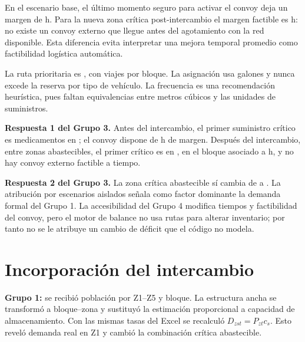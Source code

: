 \documentclass[11pt,letterpaper]{article}
\begin{document}
En el escenario base, el último momento seguro para activar el convoy deja un
margen de \MargenConvoyBase{} h. Para la nueva zona crítica post-intercambio el
margen factible es \MargenConvoy{} h: no existe un convoy externo que llegue
antes del agotamiento con la red disponible. Esta diferencia evita interpretar
una mejora temporal promedio como factibilidad logística automática.

La ruta prioritaria es \RutaPrioritaria{}, con
\ViajesRutaPrioritaria{} viajes por bloque. La asignación usa
\CombustibleUtilizado{} galones y nunca excede la reserva por tipo de vehículo.
La frecuencia es una recomendación heurística, pues faltan equivalencias entre
metros cúbicos y las unidades de suministros.

\begin{table}[H]
\centering
\caption{Primeras rutas de la recomendación de distribución.}
\label{tab:plan}
\scriptsize

\end{table}

\begin{table}[H]
\centering
\caption{Principales cuellos de botella trazados a los datos.}
\label{tab:cuellos}
\small

\end{table}

\textbf{Respuesta 1 del Grupo 3.} Antes del intercambio, el primer suministro
crítico es medicamentos en \ZonaCriticaBase{}; el convoy dispone de
\MargenConvoyBase{} h de margen. Después del intercambio, entre zonas
abastecibles, el primer crítico es \SuministroCritico{} en
\ZonaCriticaPost{}, en el bloque asociado a \TiempoAgotamientoMedio{} h, y no
hay convoy externo factible a tiempo.

\textbf{Respuesta 2 del Grupo 3.} La zona crítica abastecible sí cambia de
\ZonaCriticaBase{} a \ZonaCriticaPost{}. La atribución por escenarios aislados
señala como factor dominante la demanda formal del Grupo 1. La accesibilidad del
Grupo 4 modifica tiempos y factibilidad del convoy, pero el motor de balance no
usa rutas para alterar inventario; por tanto no se le atribuye un cambio de
déficit que el código no modela.

\section{Incorporación del intercambio}

\textbf{Grupo 1:} se recibió población por Z1--Z5 y bloque. La estructura ancha
se transformó a bloque--zona y sustituyó la estimación proporcional a capacidad
de almacenamiento. Con las mismas tasas del Excel se recalculó
$D_{zst}=P_{zt}c_s$. Esto reveló demanda real en Z1 y cambió la combinación
crítica abastecible.
\end{document}
